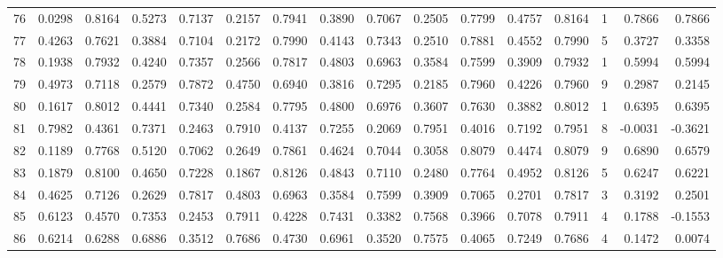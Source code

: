 \begin{tabular}{lrrrrrrrrrrrrrrr}
76  &      0.0298 &  0.8164 &  0.5273 &  0.7137 &  0.2157 &  0.7941 &  0.3890 &  0.7067 &  0.2505 &  0.7799 &   0.4757 &     0.8164 &      1 &                    0.7866 &                     0.7866 \\
77  &      0.4263 &  0.7621 &  0.3884 &  0.7104 &  0.2172 &  0.7990 &  0.4143 &  0.7343 &  0.2510 &  0.7881 &   0.4552 &     0.7990 &      5 &                    0.3727 &                     0.3358 \\
78  &      0.1938 &  0.7932 &  0.4240 &  0.7357 &  0.2566 &  0.7817 &  0.4803 &  0.6963 &  0.3584 &  0.7599 &   0.3909 &     0.7932 &      1 &                    0.5994 &                     0.5994 \\
79  &      0.4973 &  0.7118 &  0.2579 &  0.7872 &  0.4750 &  0.6940 &  0.3816 &  0.7295 &  0.2185 &  0.7960 &   0.4226 &     0.7960 &      9 &                    0.2987 &                     0.2145 \\
80  &      0.1617 &  0.8012 &  0.4441 &  0.7340 &  0.2584 &  0.7795 &  0.4800 &  0.6976 &  0.3607 &  0.7630 &   0.3882 &     0.8012 &      1 &                    0.6395 &                     0.6395 \\
81  &      0.7982 &  0.4361 &  0.7371 &  0.2463 &  0.7910 &  0.4137 &  0.7255 &  0.2069 &  0.7951 &  0.4016 &   0.7192 &     0.7951 &      8 &                   -0.0031 &                    -0.3621 \\
82  &      0.1189 &  0.7768 &  0.5120 &  0.7062 &  0.2649 &  0.7861 &  0.4624 &  0.7044 &  0.3058 &  0.8079 &   0.4474 &     0.8079 &      9 &                    0.6890 &                     0.6579 \\
83  &      0.1879 &  0.8100 &  0.4650 &  0.7228 &  0.1867 &  0.8126 &  0.4843 &  0.7110 &  0.2480 &  0.7764 &   0.4952 &     0.8126 &      5 &                    0.6247 &                     0.6221 \\
84  &      0.4625 &  0.7126 &  0.2629 &  0.7817 &  0.4803 &  0.6963 &  0.3584 &  0.7599 &  0.3909 &  0.7065 &   0.2701 &     0.7817 &      3 &                    0.3192 &                     0.2501 \\
85  &      0.6123 &  0.4570 &  0.7353 &  0.2453 &  0.7911 &  0.4228 &  0.7431 &  0.3382 &  0.7568 &  0.3966 &   0.7078 &     0.7911 &      4 &                    0.1788 &                    -0.1553 \\
86  &      0.6214 &  0.6288 &  0.6886 &  0.3512 &  0.7686 &  0.4730 &  0.6961 &  0.3520 &  0.7575 &  0.4065 &   0.7249 &     0.7686 &      4 &                    0.1472 &                     0.0074 \\

\end{tabular}
